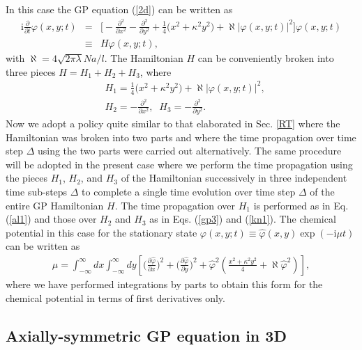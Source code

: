 \documentclass[onecolumn]{elsart3p}
\begin{document}
In this case the GP equation (\ref{2d}) can be written as
\begin{eqnarray}
\mbox{i}
\frac{\partial}{\partial t}\varphi(x,y;t) &  =&
\biggr[
-\frac{\partial^2}{\partial  x^2}
-\frac{\partial^2}{\partial  y^2}
+ \frac{1}{4} \biggr( x^2 + \kappa^2 y^2   \biggr)
+\aleph  %
|\varphi(x,y;t)|^2  \biggr]
\varphi(x,y;t) \nonumber \\ & \equiv & H \varphi(x,y;t)
,\label{a2}
\end{eqnarray}
with $\aleph  %
= 4\sqrt {2 \pi\lambda} {Na}/{l}$.
The Hamiltonian $H$ can be conveniently broken
into three pieces $H=H_1+H_2+H_3$, where
\begin{align}
& H_1= \frac{1}{4} \biggr(x^2+\kappa^2 y^2  \biggr)
+\aleph  %
|\varphi(x,y;t)|^2,  \\
& H_2=-\frac{\partial^2}{\partial x^2}, \;\;
H_3=-\frac{\partial^2}{\partial y^2}. \;\;
\end{align}
Now we adopt a policy quite similar to that elaborated in Sec.
\ref{RT} where the Hamiltonian was broken into two parts and where the
time propagation over time step $\Delta$ using the two parts were
carried out alternatively. The same procedure will be adopted in the
present case where we perform the time propagation using the pieces
$H_1$, $H_2$, and $H_3$ of the Hamiltonian successively in
three
independent time sub-steps $\Delta$ to complete a single time
evolution over time step $\Delta$ of the entire GP Hamiltonian $H$.
The time propagation over $H_1$ is performed as in Eq. (\ref{al1}) and
those over $H_2$ and $H_3$  as in Eqs. (\ref{gp3}) and
(\ref{kn1}).
The chemical potential in this case for the stationary state
$\varphi(x,y;t)\equiv \hat \varphi(x,y)\exp(-\mbox{i}\mu t)$
can be
written as
\begin{align}
\mu =
\int_{-\infty}^\infty dx \int_{-\infty}^\infty dy
 \left[ \biggr(\frac{{\partial}\hat \varphi}{
{\partial}x} 
\biggr)^2 +
\biggr(\frac{{\partial}\hat 
\varphi}{{\partial}y}
\biggr)^2
 + \hat \varphi^2 \left(
\frac{x^2+\kappa^2 y^2}{4}+\aleph  %
{\hat \varphi^2} \right)
\right] ,
\end{align}
{
where we have performed integrations by parts 
to obtain this form for the chemical potential in terms of first 
derivatives only.}


\subsection{Axially-symmetric GP equation in 3D}
\end{document}
